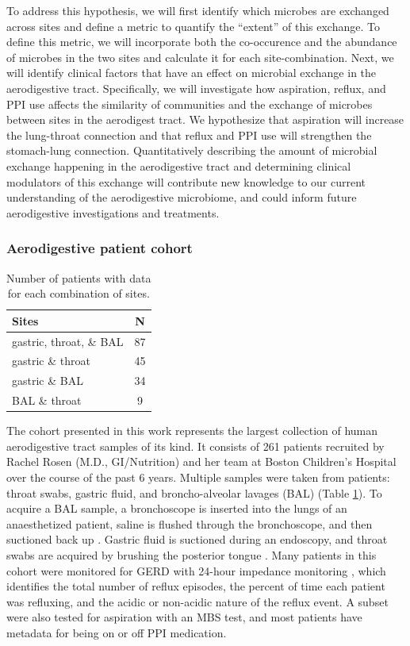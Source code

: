 \documentclass[12pt]{article}
\begin{document}
To address this hypothesis, we will first identify which microbes
are exchanged across sites and define a metric to quantify the ``extent'' of this exchange. 
To define this metric, we will incorporate both the co-occurence and the abundance
of microbes in the two sites and calculate it for each site-combination.
Next, we will identify clinical factors that have an effect on microbial
exchange in the aerodigestive tract. Specifically, we will investigate how aspiration,
reflux, and PPI use affects the similarity of communities and the
exchange of microbes between sites in the aerodigest tract.
We hypothesize that aspiration will increase the lung-throat connection and 
that reflux and PPI use will strengthen the stomach-lung connection.
Quantitatively describing the amount of microbial exchange happening in the
aerodigestive tract and determining clinical modulators of this exchange
will contribute new knowledge to our current understanding of the
aerodigestive microbiome, and could inform future aerodigestive
investigations and treatments.

\subsubsection{Aerodigestive patient cohort}

\begin{table}
\begin{tabular}{l c}
	\hline
	\textbf{Sites} & \textbf{N} \\
	\hline
	gastric, throat, \& BAL & 87 \\
	gastric \& throat & 45 \\
	gastric \& BAL & 34 \\
	BAL \& throat & 9 \\
	\hline 
\end{tabular}
\caption{Number of patients with data for each combination of sites.}\label{tab:rosen_samples}
\end{table}


The cohort presented in this work represents the largest collection of 
human aerodigestive tract samples of its kind.
It consists of 261 patients recruited by Rachel Rosen 
(M.D., GI/Nutrition) and her team at Boston Children's Hospital  
over the course of the past 6 years. Multiple samples were 
taken from patients: throat swabs, gastric fluid, and broncho-alveolar lavages (BAL) (Table \ref{tab:rosen_samples}). 
To acquire a BAL sample, a bronchoscope is inserted into the lungs 
of an anaesthetized patient, saline is flushed through the 
bronchoscope, and then suctioned back up \cite{charslon-topographical-2011}. 
Gastric fluid is suctioned during an endoscopy, and throat
swabs are acquired by brushing the posterior tongue \cite{rosen-ppi-2015}. 
Many patients in this cohort were monitored for GERD with 24-hour
impedance monitoring \cite{vakil-gerd_defn-2006}, which identifies the total number of reflux episodes,
the percent of time each patient was refluxing, and the acidic or non-acidic
nature of the reflux event. A subset were also tested for aspiration with
an MBS test, and most patients have metadata for being on or off PPI medication.
\end{document}
